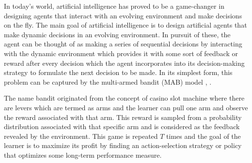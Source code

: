 

In today's world, artificial intelligence has proved to be a game-changer in designing agents that interact with an evolving environment and make decisions on the fly. The main goal of artificial intelligence is to design artificial agents that make dynamic decisions in an evolving environment. In pursuit of these, the agent can be thought of as making a series of sequential decisions by interacting with the dynamic environment which provides it with some sort of feedback or reward after every decision which the agent incorporates into its decision-making strategy to formulate the next decision to be made. In its simplest form, this problem can be captured by the multi-armed bandit (MAB) model \citep{bertsekas1996neuro}, \citep{sutton1998reinforcement}. 

	The name bandit originated from the concept of casino slot machine where there are levers which are termed as arms and the learner can pull one arm and observe the reward associated with that arm. This reward is sampled from a probability  distribution associated with that specific arm and is considered as the feedback revealed by the environment. This game is repeated $T$ times and the goal of the learner is to maximize its profit by finding an action-selection strategy or policy that optimizes some long-term performance measure. 
	


